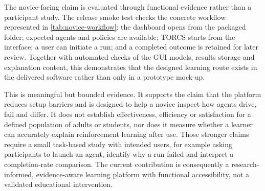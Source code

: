The novice-facing claim is evaluated through functional evidence rather than a participant study. The release smoke test checks the concrete workflow represented in \cref{tab:novice-workflow}: the dashboard opens from the packaged folder; expected agents and policies are available; TORCS starts from the interface; a user can initiate a run; and a completed outcome is retained for later review. Together with automated checks of the GUI models, results storage and explanation content, this demonstrates that the designed learning route exists in the delivered software rather than only in a prototype mock-up.

This is meaningful but bounded evidence. It supports the claim that the platform reduces setup barriers and is designed to help a novice inspect how agents drive, fail and differ. It does not establish effectiveness, efficiency or satisfaction for a defined population of adults or students, nor does it measure whether a learner can accurately explain reinforcement learning after use. Those stronger claims require a small task-based study with intended users, for example asking participants to launch an agent, identify why a run failed and interpret a completion-rate comparison. The current contribution is consequently a research-informed, evidence-aware learning platform with functional accessibility, not a validated educational intervention.
